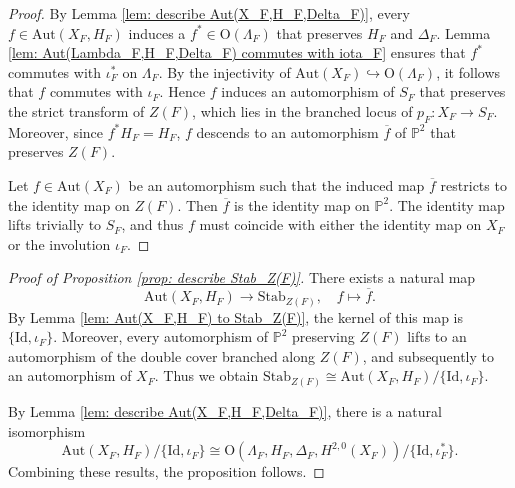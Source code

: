 \documentclass[
]{article}
\begin{document}
\emph{Proof.} By Lemma \ref{lem: describe Aut(X_F,H_F,Delta_F)}, every
\(f\in \mathrm{Aut}(X_F,H_F)\) induces a \(f^*\in\mathrm{O}(\Lambda_F)\)
that preserves \(H_F\) and \(\Delta_F\). Lemma
\ref{lem: Aut(Lambda_F,H_F,Delta_F) commutes with iota_F} ensures that
\(f^*\) commutes with \(\iota_F^*\) on \(\Lambda_F\). By the injectivity
of \(\mathrm{Aut}(X_F)\hookrightarrow\mathrm{O}(\Lambda_F)\), it follows
that \(f\) commutes with \(\iota_F\). Hence \(f\) induces an
automorphism of \(S_F\) that preserves the strict transform of \(Z(F)\),
which lies in the branched locus of \(p_F\colon X_F\to S_F\). Moreover,
since \(f^*H_F=H_F\), \(f\) descends to an automorphism \(\overline{f}\)
of \(\mathbb{P}^2\) that preserves \(Z(F)\).

Let \(f\in\mathrm{Aut}(X_F)\) be an automorphism such that the induced
map \(\overline{f}\) restricts to the identity map on \(Z(F)\). Then
\(\overline{f}\) is the identity map on \(\mathbb{P}^2\). The identity
map lifts trivially to \(S_F\), and thus \(f\) must coincide with either
the identity map on \(X_F\) or the involution \(\iota_F\).~◻

\emph{Proof of Proposition \ref{prop: describe Stab_Z(F)}.} There exists
a natural map
\[\mathrm{Aut}(X_F,H_F) \to \mathrm{Stab}_{Z(F)}, \quad f\mapsto\overline{f}.\]
By Lemma \ref{lem: Aut(X_F,H_F) to Stab_Z(F)}, the kernel of this map is
\(\{\mathrm{Id},\iota_F\}\). Moreover, every automorphism of
\(\mathbb{P}^2\) preserving \(Z(F)\) lifts to an automorphism of the
double cover branched along \(Z(F)\), and subsequently to an
automorphism of \(X_F\). Thus we obtain
\(\mathrm{Stab}_{Z(F)} \cong \mathrm{Aut}(X_F,H_F)/\{\mathrm{Id},\iota_F\}\).

By Lemma \ref{lem: describe Aut(X_F,H_F,Delta_F)}, there is a natural
isomorphism
\[\mathrm{Aut}(X_F,H_F)/\{\mathrm{Id},\iota_F\} \cong \mathrm{O}(\Lambda_F,H_F,\Delta_F,H^{2,0}(X_F))/\{\mathrm{Id},\iota_F^*\}.\]
Combining these results, the proposition follows.~◻
\end{document}
